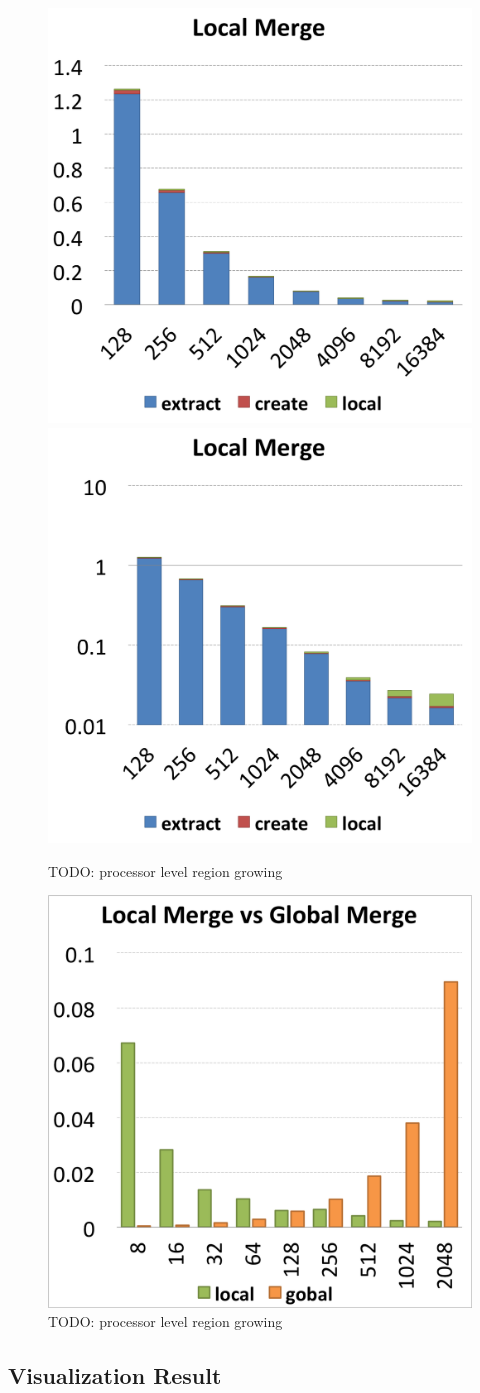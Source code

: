 \documentclass[10pt, conference, compsocconf]{IEEEtran}
\begin{document}
\begin{figure}[ht]
	\centering
	\includegraphics[width=0.45\linewidth]{local_merge.png}
	\includegraphics[width=0.45\linewidth]{local_merge_log.png}
	\caption{TODO: processor level region growing}
	\label{fig:local-merge}
\end{figure}

\begin{figure}[ht]
	\centering
	\includegraphics[width=0.45\linewidth]{local_vs_global.png}
	\caption{TODO: processor level region growing}
	\label{fig:local-vs-global}
\end{figure}

\subsection{Visualization Result}
\end{document}
